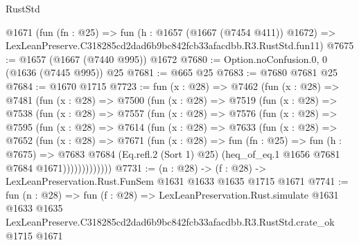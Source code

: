 \begin{lexlean}{RustStd}
\begin{coremodule}
    @1671
    (fun (fn : @25) =>
    fun (h : @1657 (@1667 (@7454 @411)) @1672) =>
    LexLeanPreserve.C318285cd2dad6b9bc842fcb33afacdbb.R3.RustStd.fun11)
@7675 := @1657 (@1667 (@7440 @995)) @1672
@7680 := Option.noConfusion.{0, 0} (@1636 (@7445 @995)) @25
@7681 := @665 @25
@7683 := @7680 @7681 @25
@7684 := @1670 @1715
@7723 := fun (x : @28) =>
  @7462
    (fun (x : @28) =>
    @7481
      (fun (x : @28) =>
      @7500
        (fun (x : @28) =>
        @7519
          (fun (x : @28) =>
          @7538
            (fun (x : @28) =>
            @7557
              (fun (x : @28) =>
              @7576
                (fun (x : @28) =>
                @7595
                  (fun (x : @28) =>
                  @7614
                    (fun (x : @28) =>
                    @7633
                      (fun (x : @28) =>
                      @7652
                        (fun (x : @28) =>
                        @7671
                          (fun (x : @28) =>
                          fun (fn : @25) =>
                          fun (h : @7675) =>
                          @7683
                            @7684
                            (Eq.refl.{2} (Sort 1) @25)
                            (heq_of_eq.{1} @1656 @7681 @7684 @1671)))))))))))))
@7731 := (n : @28) -> (f : @28) -> LexLeanPreservation.Rust.FunSem @1631 @1633 @1635 @1715 @1671
@7741 := fun (n : @28) =>
  fun (f : @28) =>
  LexLeanPreservation.Rust.simulate
    @1631
    @1633
    @1635
    LexLeanPreserve.C318285cd2dad6b9bc842fcb33afacdbb.R3.RustStd.crate_ok
    @1715
    @1671
\end{coremodule}
\end{lexlean}
